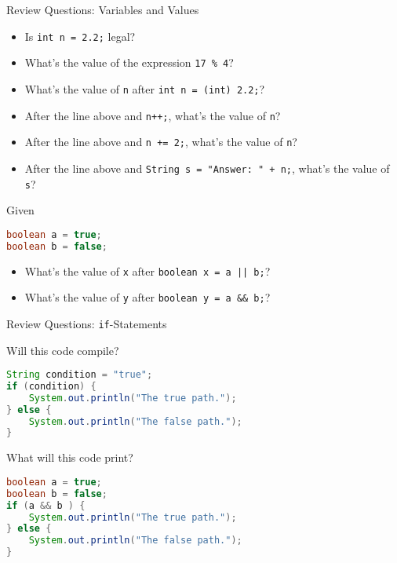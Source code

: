 \documentclass{beamer}
\begin{document}
\begin{frame}[fragile]{Review Questions: Variables and Values}

\begin{itemize}
\item Is {\tt int n = 2.2;} legal?
\item What's the value of the expression {\tt 17 \% 4}?
\item What's the value of {\tt n} after {\tt int n = (int) 2.2;}?
\item After the line above and {\tt n++;}, what's the value of {\tt n}?
\item After the line above and {\tt n += 2;}, what's the value of {\tt n}?
\item After the line above and {\tt String s = "Answer: " + n;}, what's the value of {\tt s}?
\end{itemize}
Given
\begin{lstlisting}[language=Java]
boolean a = true;
boolean b = false;
\end{lstlisting}
\vspace{-.1in}
\begin{itemize}
\item What's the value of {\tt x} after {\tt boolean x = a || b;}?
\item What's the value of {\tt y} after {\tt boolean y = a \&\& b;}?
\end{itemize}


\end{frame}

\begin{frame}[fragile]{Review Questions: {\tt if}-Statements}


Will this code compile?

\begin{lstlisting}[language=Java]
String condition = "true";
if (condition) {
    System.out.println("The true path.");
} else {
    System.out.println("The false path.");
}
\end{lstlisting}

What will this code print?
\begin{lstlisting}[language=Java]
boolean a = true;
boolean b = false;
if (a && b ) {
    System.out.println("The true path.");
} else {
    System.out.println("The false path.");
}
\end{lstlisting}

\end{frame}
\end{document}
